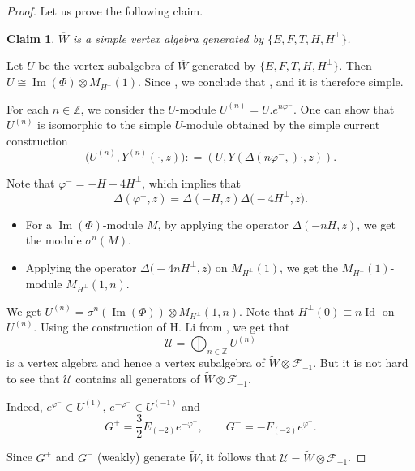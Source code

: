 \documentclass[pdftex]{sigma}
\numberwithin{equation}{section}
\newcommand{\Z}{\mathbb Z}
\newcommand{\F}{\mathcal F}
\newtheorem{Claim}[Theorem]{Claim}
\begin{document}
\begin{proof}
Let us prove the following claim.
\begin{Claim}\label{Claim1}
 $ \overline W $ is a simple vertex algebra generated by $\big\{ E,F,T,H, H^{\perp} \big\}$.
\end{Claim}

Let $U$ be the vertex subalgebra of $\overline W $ generated by $ \big\{E,F,T,H, H^{\perp} \big\}$. Then $U \cong \operatorname{Im} (\Phi) \otimes M_{H^{\perp}} (1)$. Since , we conclude that
, and it is therefore simple.

 For each $n \in {\Z}$, we consider the $U$-module $U^{(n)} = U. e^{n \varphi^-}$. One can show that
 $ U^{(n)} $ is isomorphic to the simple $U$-module obtained by the simple current construction
\[
 \bigl(U^{(n)}, Y^{(n)} (\cdot, z)\bigr): = (U , Y(\Delta(n \varphi^-,) \cdot, z)).
 \]


 Note that $ \varphi^- = -H - 4 H^{\perp}$, which implies that
 \[%
 \Delta(\varphi^-, z) = \Delta( -H, z) \Delta\bigl(- 4 H^{\perp}, z\bigr).
 \]
 \begin{itemize}\itemsep=0pt
\item For a $ \operatorname{Im} (\Phi)$-module $M$, by applying the operator $\Delta(-nH, z)$, we get the module $\sigma^{n}( M)$.
\item Applying the operator $ \Delta\bigl( -4n H^{\perp}, z\bigr)$ on
 $ M_{H^{\perp}}(1)$, we get the $ M_{H^{\perp}}(1)$-module
$ M_{H^{\perp}} (1, n )$.
\end{itemize}

We get
$
U^{(n)}= \sigma^{n}( \operatorname{Im} (\Phi)) \otimes M_{H^{\perp}} (1,n )$.
Note that $ H^{\perp} (0) \equiv n \operatorname{Id} $ on $U^{(n)}$.
 Using the construction of H. Li from \cite{Li-ext}, we get that
\[%
 \mathcal U = \bigoplus_{n \in \mathbb{Z}} U^{(n)}
 \]
is a vertex algebra and hence a vertex subalgebra of $ \widetilde W \otimes \F_{-1}$. But it is not hard to see that $ \mathcal U$ contains all generators of $ \widetilde W \otimes \F_{-1}$.

 Indeed, $e^{\varphi^-}\in U^{(1)}$, $e^{-\varphi^-}\in U^{(-1)}$ and
 \[
 G^+ = \frac{3}{2} E_{(-2)}e^{-\varphi^-}, \qquad G^- =- F_{(-2)}e^{\varphi^-}.
 \]


Since $G^+$ and $G^-$ (weakly) generate $ \widetilde W$, it follows that
$
 \mathcal U = \widetilde W \otimes \F_{-1}$.







\end{proof}
\end{document}

